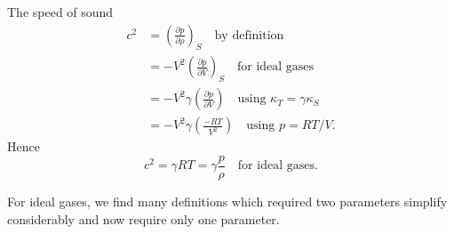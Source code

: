 \begin{node}
The speed of sound
\begin{subequations}
  \begin{align}
c^{2} &= \left(\frac{\partial p}{\partial\rho}\right)_{S}\quad\mbox{by definition}\\
&= -V^{2}\left(\frac{\partial p}{\partial V}\right)_{S}\quad\mbox{for ideal gases}\\
&= - V^{2}\gamma\left(\frac{\partial p}{\partial V}\right)\quad\mbox{using $\kappa_{T}=\gamma\kappa_{S}$}\\
&= -V^{2}\gamma\left(\frac{-RT}{V^{2}}\right)\quad\mbox{using $p=RT/V$}.
  \end{align}
\end{subequations}
Hence
\begin{equation}\label{eq:me101a:lec17:fall2026:speed-of-sound}
\boxed{c^{2}=\gamma RT = \gamma\frac{p}{\rho}\quad\mbox{for ideal gases}.}
\end{equation}

\end{node}

\begin{remark}
For ideal gases, we find many definitions which required two
parameters simplify considerably and now require only one parameter.
\end{remark}

